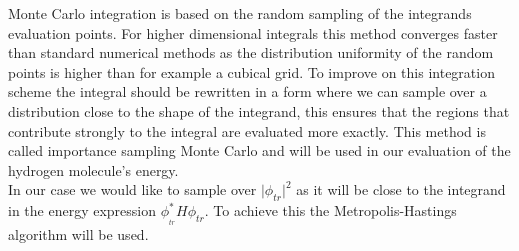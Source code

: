 Monte Carlo integration is based on the random sampling of the integrands evaluation points. For higher dimensional integrals this method converges faster than standard numerical methods as the distribution uniformity of the random points is higher than for example a cubical grid. To improve on this integration scheme the integral should be rewritten in a form where we can sample over a distribution close to the shape of the integrand, this ensures that the regions that contribute strongly to the integral are evaluated more exactly. This method is called importance sampling Monte Carlo and will be used in our evaluation of the hydrogen molecule’s energy. \\
In our case we would like to sample over  $|{\phi _{tr}}{|^2}$ as it will be close to the integrand in the energy expression $\phi _{_{tr}}^*H{\phi _{tr}}$. To achieve this the Metropolis-Hastings algorithm will be used.